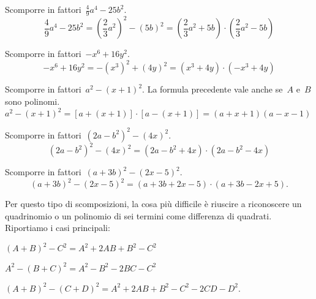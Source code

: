 \begin{exrig}
 \begin{esempio}
Scomporre in fattori~$\frac{4}{9}a^{4}-25b^{2}$.
\[\frac{4}{9}a^{4}-25b^{2}=
  \left(\frac{2}{3}a^{2}\right)^{2}-\left(5b\right)^{2}=
  \left(\frac{2}{3}a^{2}+5b\right)\cdot \left(\frac{2}{3}a^{{2}}-5b\right)\]
 \end{esempio}

 \begin{esempio}
Scomporre in fattori~$-x^{6}+16y^{2}$.
\[-x^{6}+16y^{2}=-\left(x^{3}\right)^{2}+\left(4y\right)^{2}=
  \left(x^{3}+4y\right)\cdot \left(-x^{3}+4y\right)\]
 \end{esempio}

 \begin{esempio}
Scomporre in fattori~$a^{2}-\left(x+1\right)^{2}$.
La formula precedente vale anche se~$A$ e~$B$ sono polinomi. 
$a^{2}-\left(x+1\right)^{2}=
 \left[a+(x+1)\right]\cdot \left[a-(x+1)\right]=(a+x+1)(a-x-1)$
\end{esempio}

 \begin{esempio}
Scomporre in fattori~$\left(2a-b^{2}\right)^{2}-(4x)^{2}$.
\[\left(2a-b^{2}\right)^{2}-(4x)^{2}=
\left(2a-b^{2}+4x\right)\cdot \left(2a-b^{2}-4x\right)\]
 \end{esempio}

 \begin{esempio}
Scomporre in fattori~$(a+3b)^{2}-(2x-5)^{2}$.
\[(a+3b)^{2}-(2x-5)^{2}=(a+3b+2x-5)\cdot (a+3b-2x+5).\]
 \end{esempio}
\end{exrig}

Per questo tipo di scomposizioni, la cosa più difficile è riuscire a 
riconoscere un quadrinomio o un polinomio di sei termini come differenza 
di quadrati. Riportiamo i casi principali:
\begin{itemize*}
 \item $(A+B)^{2}-C^{2}=A^{{2}}+2AB+B^{2}-C^{2}$
 \item $A^{2}-(B+C)^{2}=A^{2}-B^{2}-2BC-C^{2}$
 \item $(A+B)^{2}-(C+D)^{2}=A^{2}+2AB+B^{2}-C^{2}-2CD-D^{2}$.
\end{itemize*}

